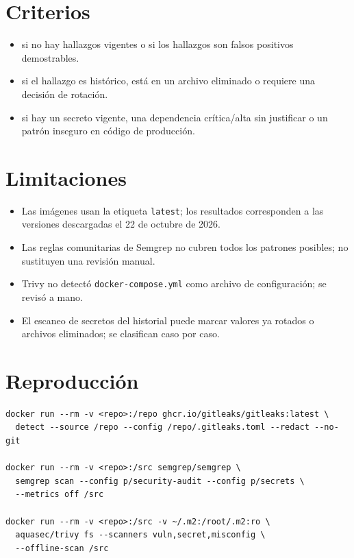 \documentclass[11pt]{article}
\begin{document}
\section{Criterios}

\begin{itemize}
  \item \ok{} si no hay hallazgos vigentes o si los hallazgos son falsos
  positivos demostrables.
  \item \aviso{} si el hallazgo es histórico, está en un archivo eliminado o
  requiere una decisión de rotación.
  \item \fallo{} si hay un secreto vigente, una dependencia crítica/alta sin
  justificar o un patrón inseguro en código de producción.
\end{itemize}

\section{Limitaciones}

\begin{itemize}
  \item Las imágenes usan la etiqueta \texttt{latest}; los resultados
  corresponden a las versiones descargadas el 22 de octubre de 2026.
  \item Las reglas comunitarias de Semgrep no cubren todos los patrones
  posibles; no sustituyen una revisión manual.
  \item Trivy no detectó \texttt{docker-compose.yml} como archivo de
  configuración; se revisó a mano.
  \item El escaneo de secretos del historial puede marcar valores ya rotados o
  archivos eliminados; se clasifican caso por caso.
\end{itemize}

\section{Reproducción}

\begin{verbatim}
docker run --rm -v <repo>:/repo ghcr.io/gitleaks/gitleaks:latest \
  detect --source /repo --config /repo/.gitleaks.toml --redact --no-git

docker run --rm -v <repo>:/src semgrep/semgrep \
  semgrep scan --config p/security-audit --config p/secrets \
  --metrics off /src

docker run --rm -v <repo>:/src -v ~/.m2:/root/.m2:ro \
  aquasec/trivy fs --scanners vuln,secret,misconfig \
  --offline-scan /src
\end{verbatim}
\end{document}
